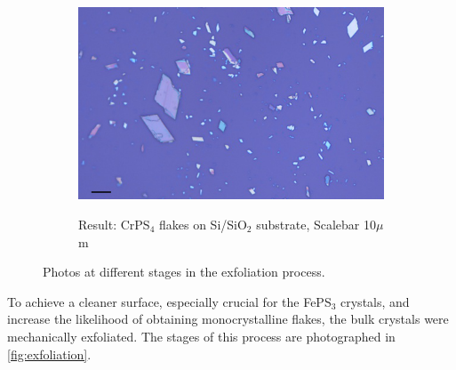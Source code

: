 \documentclass[
	twoside,
	parskip=half,
	a4paper,
]{scrbook}
\begin{document}
\begin{figure}
\begin{subfigure}[t]{.3\textwidth}
		\label{fig:exfoliation_transfer}
	\end{subfigure}
	\begin{subfigure}[t]{.3\textwidth}
		\vskip 0pt
		\includegraphics[width=\textwidth]{../../data/2023-12-04_LO_MG_NiPS3/CrPS4_50x_10um.png}\\
		\caption{Result: CrPS$_\text{4}$ flakes on Si/SiO$_\text{2}$ substrate, Scalebar 10$\mu$m}
		\label{fig:exfoliation_result}
	\end{subfigure}
	\caption{Photos at different stages in the exfoliation process.}
	\label{fig:exfoliation}
\end{figure}
To achieve a cleaner surface, especially crucial for the FePS$_3$ crystals, and increase the likelihood of obtaining monocrystalline flakes, the bulk crystals were mechanically exfoliated.
The stages of this process are photographed in \autoref{fig:exfoliation}.
\end{document}
